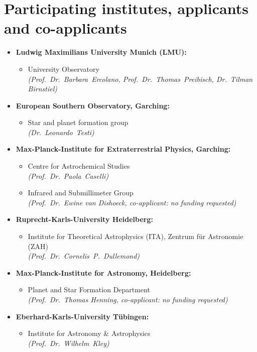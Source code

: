 \documentclass[10pt,fleqn,twoside]{article}
\begin{document}
\section{Participating institutes,  applicants and co-applicants}
\label{app-institutes}
\begin{itemize}
\item {\bf Ludwig Maximilians University Munich (LMU):}
 \begin{itemize}
  \item University Observatory\\    
         {\em (Prof.~Dr.~Barbara~Ercolano, Prof.~Dr.~Thomas~Preibisch,
           Dr.~Tilman Birnstiel)}
  \end{itemize} 
\item {\bf European Southern Observatory, Garching:}
 \begin{itemize} 
\item Star and planet formation group \\
         {\em (Dr.~Leonardo~Testi)}
\end{itemize}
\item {\bf Max-Planck-Institute for Extraterrestrial Physics, Garching:}
 \begin{itemize} 
\item Centre for Astrochemical Studies \\
         {\em (Prof.~Dr.~Paola~Caselli)}
\item Infrared and Submillimeter Group\\
         {\em (Prof.~Dr.~Ewine van Dishoeck, co-applicant: no funding requested)}
\end{itemize}
\item {\bf Ruprecht-Karls-University Heidelberg:}
\begin{itemize}
 \item Institute for Theoretical Astrophysics (ITA), Zentrum f\"ur Astronomie (ZAH)\\
         {\em (Prof.~Dr.~Cornelis~P.~Dullemond)}
\end{itemize}
\item {\bf Max-Planck-Institute for Astronomy, Heidelberg:}
\begin{itemize}
 \item Planet and Star Formation Department\\
         {\em (Prof.~Dr.~Thomas Henning, co-applicant: no funding requested)}
\end{itemize}
\item {\bf Eberhard-Karls-University T\"ubingen:}
\begin{itemize}
  \item Institute for Astronomy \& Astrophysics\\
         {\em (Prof.~Dr.~Wilhelm~Kley)}
\end{itemize}
\end{itemize}
%
\vfill
\end{document}
